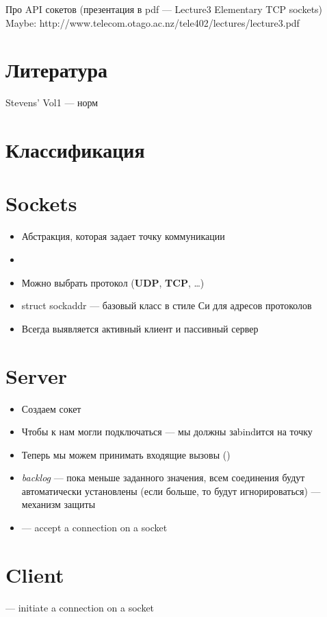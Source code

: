 Про API сокетов (презентация в pdf --- Lecture3 Elementary TCP sockets)
Maybe: http://www.telecom.otago.ac.nz/tele402/lectures/lecture3.pdf

\section{Литература}
Stevens' Vol1 --- норм

\section{Классификация}

\section{Sockets}
\begin{itemize}
    \item Абстракция, которая задает точку коммуникации
    \item {}
    \item Можно выбрать протокол (\textbf{UDP}, \textbf{TCP}, \ldots)
    \item struct sockaddr --- базовый класс в стиле Си для адресов протоколов
    \item Всегда выявляется активный клиент и пассивный сервер
\end{itemize}

\section{Server}
\begin{itemize}
    \item Создаем сокет
    \item Чтобы к нам могли подключаться --- мы должны заbindится на точку\\
    \item Теперь мы можем принимать входящие вызовы ()
    \item \emph{backlog} --- пока меньше заданного значения, всем соединения будут 
          автоматически установлены (если больше, то будут игнорироваться) 
          --- механизм защиты
    \item {} --- accept a connection on a socket
\end{itemize}

\section{Client}
 --- initiate a connection on a socket

